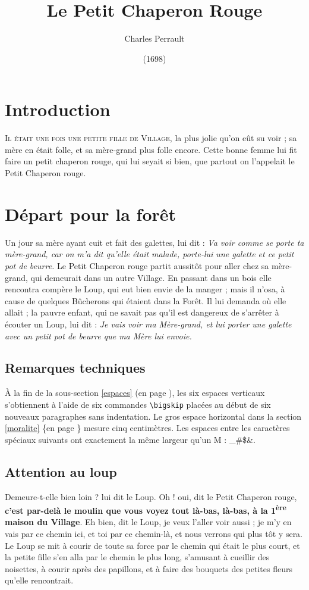 \documentclass[a4paper,11pt]{article}
\title{Le Petit Chaperon Rouge}
\author{Charles Perrault}
\date{(1698)}
\begin{document}
\maketitle

\section{Introduction}
\textsc{Il était une fois une petite fille de Village}, la plus jolie qu'on eût su voir ; sa mère en était folle, et sa mère-grand plus folle encore. Cette bonne femme lui fit faire un petit chaperon rouge, qui lui seyait si bien, que partout on l'appelait le Petit Chaperon rouge.

\section{Départ pour la forêt}
Un jour sa mère ayant cuit et fait des galettes, lui dit :
\textit{Va voir comme se porte ta mère-grand, car on m'a dit qu'elle était malade, porte-lui une galette et ce petit pot de beurre.} Le Petit Chaperon rouge partit aussitôt pour aller chez sa mère-grand, qui demeurait dans un autre Village. En passant dans un bois elle rencontra compère le Loup, qui eut bien envie de la manger ; mais il n'osa, à cause de quelques Bûcherons qui étaient dans la Forêt. Il lui demanda où elle allait ; la pauvre enfant, qui ne savait pas qu'il est dangereux de s'arrêter à écouter un Loup, lui dit : \textit{Je vais voir ma Mère-grand, et lui porter une galette avec un petit pot de beurre que ma Mère lui envoie.}

\subsection{Remarques techniques}
À la fin de la sous-section \ref{espaces} (en page \pageref{espaces}), les six espaces verticaux s'obtiennent à l'aide de six commandes \texttt{\textbackslash bigskip} placées au début de six nouveaux paragraphes sans indentation. Le gros espace horizontal dans la section \ref{moralite} \{en page \pageref{moralite}\} mesure cinq centimètres. Les espaces entre les caractères spéciaux suivants ont exactement la même largeur qu'un M : \_\quad\#\quad\$\quad\&.

\subsection{Attention au loup}
Demeure-t-elle bien loin ? lui dit le Loup. Oh ! oui, dit le Petit Chaperon rouge, \textbf{c'est par-delà le moulin que vous voyez tout là-bas, là-bas, à la 1\textsuperscript{ère} maison du Village}. Eh bien, dit le Loup, je veux l'aller voir aussi ; je m'y en vais par ce chemin ici, et toi par ce chemin-là, et nous verrons qui plus tôt y sera. Le Loup se mit à courir de toute sa force par le chemin qui était le plus court, et la petite fille s'en alla par le chemin le plus long, s'amusant à cueillir des noisettes, à courir après des papillons, et à faire des bouquets des petites fleurs qu'elle rencontrait.
\end{document}
